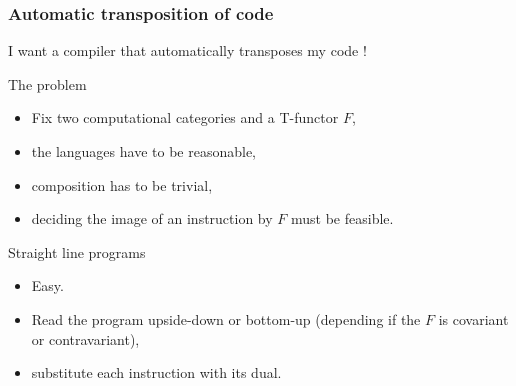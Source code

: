 \documentclass[10pt]{beamer}
\begin{document}
\begin{frame}
  \frametitle{Automatic transposition of code}

  \begin{center}
    \Large
    I want a compiler that automatically transposes my code !
  \end{center}

  \begin{block}{The problem}
    \begin{itemize}
    \item Fix two computational categories and a T-functor $F$,
    \item the languages have to be \alert{reasonable},
    \item composition has to be \alert{trivial},
    \item deciding the image of an instruction by $F$ must be
      \alert{feasible}.
    \end{itemize}
  \end{block}

  \begin{block}{Straight line programs}
    \begin{itemize}
    \item Easy.
    \item Read the program upside-down or bottom-up (depending if the
      $F$ is covariant or contravariant),
    \item substitute each instruction with its dual.
    \end{itemize}
  \end{block}

\end{frame}
\end{document}
